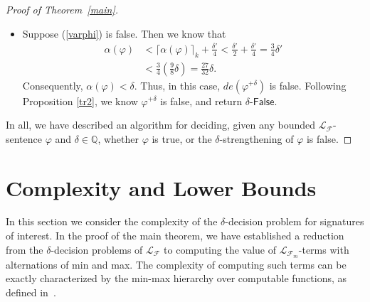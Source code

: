 \documentclass[conference]{IEEEtran}
\begin{document}
\begin{proof}[Proof of Theorem~\ref{main}]
\begin{itemize}
\item Suppose (\ref{varphi}) is false. Then we know that 
\begin{align*}
\alpha(\varphi)&<\lceil\alpha(\varphi)\rceil_k + \frac{\delta'}{4}< \frac{\delta'}{2} +\frac{\delta'}{4} = \frac{3}{4}\delta'\\
&<\frac{3}{4}(\frac{9}{8}\delta) = \frac{27}{32}\delta.
\end{align*}
Consequently, $\alpha(\varphi)<\delta$. Thus, in this case, $\mathit{de}(\varphi^{+\delta})$ is false. Following Proposition \ref{tr2}, we know $\varphi^{+\delta}$ is false, and return $\delta$-$\mathsf{False}$.
\end{itemize}
In all, we have described an algorithm for deciding, given any bounded $\mathcal{L}_{\mathcal{F}}$-sentence $\varphi$ and $\delta\in \mathbb{Q}$, whether $\varphi$ is true, or the $\delta$-strengthening of $\varphi$ is false.
\end{proof}



\section{Complexity and Lower Bounds}\label{complexity}

In this section we consider the complexity of the $\delta$-decision problem for signatures of interest. In the proof of the main theorem, we have established a reduction from the $\delta$-decision problems of $\mathcal{L}_{\mathcal{F}}$ to computing the value of $\mathcal{L}_{\mathcal{F}_m}$-terms with alternations of min and max. The complexity of computing such terms can be exactly characterized by the min-max hierarchy over computable functions, as defined in~\cite{Kobook}. 
\end{document}
